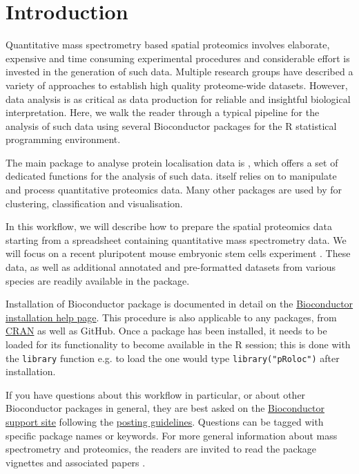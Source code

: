


\section*{Introduction}

Quantitative mass spectrometry based spatial proteomics involves
elaborate, expensive and time consuming experimental procedures and
considerable effort is invested in the generation of such data.
Multiple research groups have described a variety of approaches to
establish high quality proteome-wide datasets. However, data analysis
is as critical as data production for reliable and insightful
biological interpretation. Here, we walk the reader through a typical
pipeline for the analysis of such data using several Bioconductor
packages for the R statistical programming environment.

The main package to analyse protein localisation data is
, which offers a set of dedicated functions for the
analysis of such data.  itself relies on
 to manipulate and process quantitative
proteomics data. Many other packages are used by 
for clustering, classification and visualisation.

In this workflow, we will describe how to prepare the spatial
proteomics data starting from a spreadsheet containing quantitative
mass spectrometry data. We will focus on a recent pluripotent mouse
embryonic stem cells experiment \cite{hyper}. These data, as well as
additional annotated and pre-formatted datasets from various species
are readily available in the  package.

Installation of Bioconductor package is documented in detail on the
\href{http://bioconductor.org/install/#install-bioconductor-packages}{Bioconductor
  installation help page}. This procedure is also applicable to any
packages, from \href{https://cran.r-project.org/}{CRAN} as well as
GitHub. Once a package has been installed, it needs to be loaded for
its functionality to become available in the R session; this is done
with the \texttt{library} function e.g.  to load the
 one would type \texttt{library("pRoloc")}
after installation.

If you have questions about this workflow in particular, or about
other Bioconductor packages in general, they are best asked on the
\href{https://support.bioconductor.org/}{Bioconductor support site}
following the
\href{http://www.bioconductor.org/help/support/posting-guide/}{posting
  guidelines}. Questions can be tagged with specific package names or
keywords. For more general information about mass spectrometry and
proteomics, the readers are invited to read the
 package vignettes and associated
papers \cite{Gatto:2014,Gatto:2015}.


